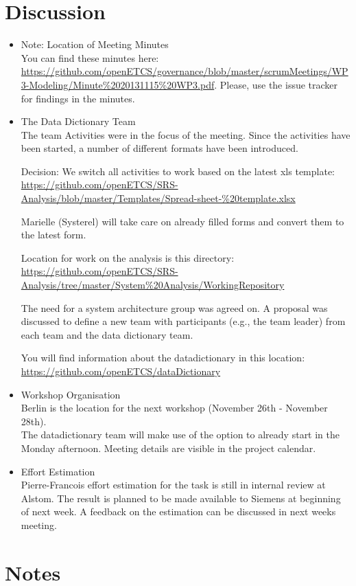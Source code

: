 \documentclass[a4paper, 11pt]{article}
\begin{document}
\section{Discussion}
\begin{itemize}
\item Note: Location of Meeting Minutes\\
You can find these minutes here: \url{https://github.com/openETCS/governance/blob/master/scrumMeetings/WP3-Modeling/Minute%2020131115%20WP3.pdf}. Please, use the issue tracker for findings in the minutes.
 
\item The Data Dictionary Team\\
The team Activities were in the focus of the meeting. Since the activities have been started, a number of different formats have been introduced. 

Decision: We switch all activities to work based on the latest xls template: \url{https://github.com/openETCS/SRS-Analysis/blob/master/Templates/Spread-sheet-%20template.xlsx} 

Marielle (Systerel) will take care on already filled forms and convert them to the latest form.

Location for work on the analysis is this directory: \url{https://github.com/openETCS/SRS-Analysis/tree/master/System%20Analysis/WorkingRepository}

The need for a system architecture group was agreed on. A proposal was discussed to define a new team with participants (e.g., the team leader) from each team and the data dictionary team.

You will find information about the datadictionary in this location: \url{https://github.com/openETCS/dataDictionary}

\item Workshop Organisation\\
Berlin is the location for the next workshop (November 26th - November 28th).\\
The datadictionary team will make use of the option to already start in the Monday afternoon. Meeting details are visible in the project calendar.

\item Effort Estimation\\
Pierre-Francois effort estimation for the task is still in internal review at Alstom. The result is planned to be made available to Siemens at beginning of next week. A feedback on the estimation can be discussed in next weeks meeting.

\end{itemize}

\section{Notes}
\end{document}
